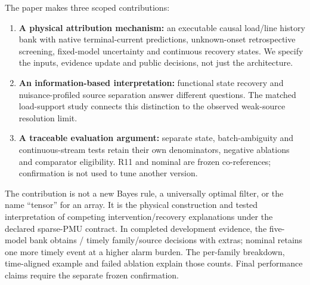 The paper makes three scoped contributions:
\begin{enumerate}
\item \textbf{A physical attribution mechanism:} an executable causal load/line history bank with native terminal-current predictions, unknown-onset retrospective screening, fixed-model uncertainty and continuous recovery states. We specify the inputs, evidence update and public decisions, not just the architecture.
\item \textbf{An information-based interpretation:} functional state recovery and nuisance-profiled source separation answer different questions. The matched load-support study connects this distinction to the observed weak-source resolution limit.
\item \textbf{A traceable evaluation argument:} separate state, batch-ambiguity and continuous-stream tests retain their own denominators, negative ablations and comparator eligibility. R11 and nominal are frozen co-references; confirmation is not used to tune another version.
\end{enumerate}

The contribution is not a new Bayes rule, a universally optimal filter, or the name ``tensor'' for an array. It is the physical construction and tested interpretation of competing intervention/recovery explanations under the declared sparse-PMU contract. In completed development evidence, the five-model bank obtains \ContMixTimely{}/\ContMixTotal{} timely family/source decisions with \ContMixExtras{} extras; nominal retains one more timely event at a higher alarm burden. The per-family breakdown, time-aligned example and failed ablation explain those counts. Final performance claims require the separate frozen confirmation.


